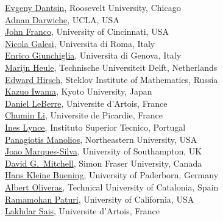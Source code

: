 \documentclass[10pt]{article}
\begin{document}
\begin{minipage}[t]{7.5cm}
{          \href{http://cs.roosevelt.edu/~dantsin/}{Evgeny Dantsin}, Roosevelt University, Chicago \\
          \href{http://www.cs.ucla.edu/~darwiche/}{Adnan Darwiche}, UCLA, USA \\
          \href{http://www.ececs.uc.edu/~franco/}{John Franco}, University of Cincinnati, USA  \\
          \href{http://www.dsi.uniroma1.it/~galesi/}{Nicola Galesi}, Universita di Roma, Italy  \\
          \href{http://www.star.dist.unige.it/index.php?option=com_uhp2&task=viewpage&item_id=50&user_id=74}{Enrico Giunchiglia}, Universita di Genova, Italy \\
          \href{http://www.st.ewi.tudelft.nl/~marijn/}{Marijn Heule}, Technische Universiteit Delft, Netherlands \\
          \href{http://logic.pdmi.ras.ru/~hirsch/}{Edward Hirsch}, Steklov Institute of Mathematics, Russia  \\
          \href{http://www.lab2.kuis.kyoto-u.ac.jp/~iwama/}{Kazuo Iwama}, Kyoto University, Japan  \\
          \href{http://www.cril.univ-artois.fr/~leberre/}{Daniel LeBerre}, Universite d'Artois, France  \\
          \href{http://www.laria.u-picardie.fr/~cli/}{Chumin Li}, Universite de Picardie, France  \\
          \href{http://sat.inesc-id.pt/~ines/}{Ines Lynce}, Instituto Superior Tecnico, Portugal \\
          \href{http://www.ccs.neu.edu/home/pete}{Panagiotis Manolios}, Northeastern University, USA  \\
          \href{http://users.ecs.soton.ac.uk/jpms/}{Joao Marques-Silva}, University of Southampton, UK  \\
          \href{http://www.cs.sfu.ca/~mitchell/}{David G.\ Mitchell}, Simon Fraser University, Canada  \\
          \href{http://wwwcs.uni-paderborn.de/cs/ag-klbue/en/staff/kbcsl/index.html}{Hans Kleine Buening}, University of Paderborn, Germany  \\
          \href{http://www.lsi.upc.edu/~oliveras/}{Albert Oliveras}, Technical University of Catalonia, Spain  \\
          \href{http://www-cse.ucsd.edu/~paturi/}{Ramamohan Paturi}, University of California, USA  \\
          \href{http://www.cril.univ-artois.fr/~sais/}{Lakhdar Sais}, Universite d'Artois, France  \\
}
\end{minipage}
\end{document}
